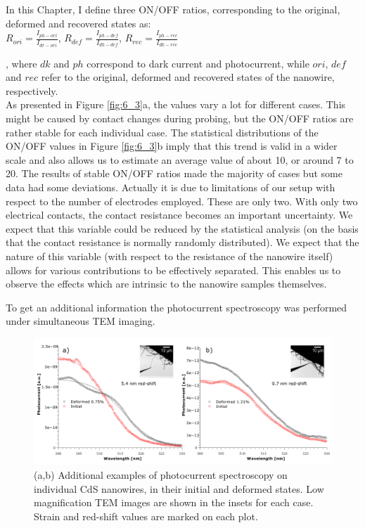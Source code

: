 In this Chapter, I define three ON/OFF ratios, corresponding to the original, deformed and recovered states as:\\
{\center
$R_{ori} = \frac{I_{ph-ori}}{I_{dr-ori}}$, $R_{def} = \frac{I_{ph-def}}{I_{dk-def}}$, $R_{rec} = \frac{I_{ph-rec}}{I_{dk-rec}}$\\}

\vspace{5pt}, where $dk$ and $ph$ correspond to dark current and photocurrent, while $ori$, $def$ and $rec$ refer to the original, deformed and recovered states of the nanowire, respectively.\\

As presented in Figure \ref{fig:6_3}a, the values vary a lot for different cases. This might be caused by contact changes during probing, but the ON/OFF ratios are rather stable for each individual case. 
The statistical distributions of the ON/OFF values in Figure \ref{fig:6_3}b imply that this trend is valid in a wider scale and also allows us to estimate an average value of about 10, or around 7 to 20. 
The results of stable ON/OFF ratios made the majority of cases but some data had some deviations. 
Actually it is due to limitations of our setup with respect to the number of electrodes employed. These are only two. 
With only two electrical contacts, the contact resistance becomes an important uncertainty.\cite{Hummelgard2011} 
We expect that this variable could be reduced by the statistical analysis (on the basis that the contact resistance is normally randomly distributed). 
We expect that the nature of this variable (with respect to the resistance of the nanowire itself) allows for various contributions to be effectively separated. This enables us to observe the effects which are intrinsic to the nanowire samples themselves.

To get an additional information the photocurrent spectroscopy was performed under simultaneous TEM imaging. 

\begin{figure}  [t]
\includegraphics[width=\textwidth]{figures/figure6_s3}
\caption[Photocurrent spectroscopy of deformed CdS NW]
{(a,b) Additional examples of photocurrent spectroscopy on individual CdS nanowires, in their initial and deformed states. Low magnification TEM images are shown in the insets for each case. Strain and red-shift values are marked on each plot. 
\label{fig:6_s3}}
\end{figure}

